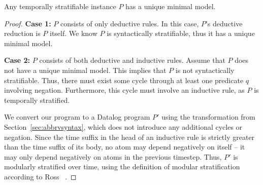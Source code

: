 \begin{lemma}
%
Any temporally stratifiable \slang instance $P$ has a unique minimal model.
%
\end{lemma} 

\begin{proof}
%
{\bf Case 1:} $P$ consists of only deductive rules.  In this case, $P$'s
deductive reduction is $P$ itself.  We know $P$ is syntactically stratifiable,
thus it has a unique minimal model.

{\bf Case 2:} $P$ consists of both deductive and inductive rules.
Assume that $P$ does not have a unique minimal model.  This implies that $P$ is
not syntactically stratifiable.  Thus, there must exist some cycle through at
least one predicate $q$ involving negation.
Furthermore, this
cycle must involve an inductive rule, as $P$ is temporally stratified.

We convert our \slang program to a Datalog program $P'$ using the
transformation from Section~\ref{sec:abbrvsyntax}, which does not introduce any
additional cycles or negation.  Since the time suffix in the head of an
inductive rule is strictly greater than the time suffix of its body, no atom
may depend negatively on itself -- it may only depend negatively on atoms in
the previous timestep.  Thus, $P'$ is modularly stratified over time, using the
definition of modular stratification according to Ross \etal~\cite{modular}.
%
%
\end{proof}


